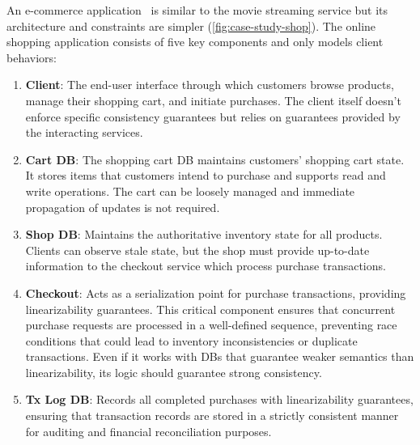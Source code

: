 %
%
An e-commerce application~\cite{gan2019an} is similar to the movie
streaming service but its architecture and constraints are simpler
(\cref{fig:case-study-shop}).
The online shopping application consists of five key components and only
models client behaviors:
\begin{enumerate}[leftmargin=*, noitemsep,topsep=0pt]
\item \textbf{Client}: The end-user interface through which
  customers browse products, manage their shopping cart, and
  initiate purchases. The client itself doesn't enforce specific
  consistency guarantees but relies on guarantees provided by
  the interacting services.

\end{enumerate}

\begin{enumerate}[leftmargin=*, noitemsep,topsep=0pt]
\setcounter{enumi}{1}
\item \textbf{Cart DB}: The shopping cart DB maintains customers'
  shopping cart state. It stores items that customers intend to
  purchase and supports read and write operations. The cart can be
  loosely managed and immediate propagation of updates is not required.
\item \textbf{Shop DB}: Maintains the authoritative inventory state
  for all products. Clients can observe stale state, but the shop must provide
  up-to-date information to the checkout service which process purchase
  transactions.

\item \textbf{Checkout}: Acts as a serialization point for
  purchase transactions, providing linearizability guarantees. This
  critical component ensures that concurrent purchase requests are
  processed in a well-defined sequence, preventing race conditions
  that could lead to inventory inconsistencies or duplicate transactions.
  Even if it works with DBs that guarantee weaker semantics than
  linearizability,
  its logic should guarantee strong consistency.

\item \textbf{Tx Log DB}: Records all completed purchases
  with linearizability guarantees, ensuring that transaction
  records are stored in a strictly consistent manner for auditing
  and financial reconciliation purposes.
\end{enumerate}

